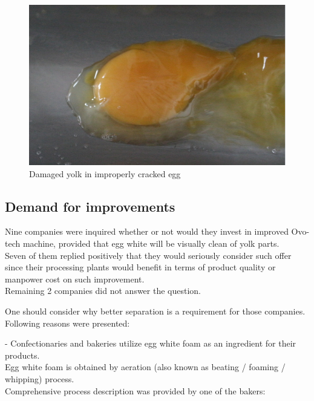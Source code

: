 \documentclass[12pt,twoside,a4paper]{article}
\begin{document}
 
\begin{figure}[H]
\centering
\includegraphics[width=0.4\paperwidth]{damg}
\caption{Damaged yolk in improperly cracked egg}
\end{figure}

\subsection{Demand for improvements}

Nine companies were inquired whether or not would they invest in improved Ovo-tech machine, provided that egg white will be visually clean of yolk parts.\\
Seven of them replied positively that they would seriously consider such offer since their processing plants would benefit in terms of product quality or manpower cost on such improvement.\\
Remaining 2 companies did not answer the question.

One should consider why better separation is a requirement for those companies.\\
Following reasons were presented:

- Confectionaries and bakeries utilize egg white foam as an ingredient for their products.\\
Egg white foam is obtained by aeration (also known as beating / foaming / whipping) process.\\
Comprehensive process description was provided by one of the bakers:
\end{document}
